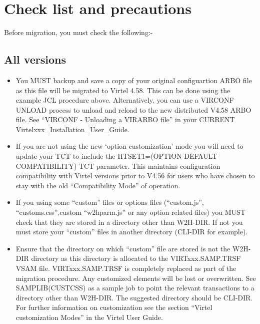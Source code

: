 \documentclass[letterpaper,10pt,english]{sphinxmanual}
\begin{document}
\chapter{Check list and precautions}
\label{\detokenize{Migration_Guide:check-list-and-precautions}}\label{\detokenize{Migration_Guide:index-2}}
Before migration, you must check the following:-


\section{All versions}
\label{\detokenize{Migration_Guide:all-versions}}\begin{itemize}
\item {} 
You MUST backup and save a copy of your original configuartion ARBO file as this file will be migrated to Virtel 4.58. This can be done using the example JCL procedure above. Alternatively, you can use a VIRCONF UNLOAD process to unload and reload to the new distributed V4.58 ARBO file. See “VIRCONF - Unloading a VIRARBO file” in your CURRENT Virtelxxx\_Installation\_User\_Guide.

\item {} 
If you are not using the new ‘option customization’ mode you will need to update your TCT to include the HTSET1=(OPTION-DEFAULT-COMPATIBILITY) TCT parameter. This maintains configuration compatibility with Virtel versions prior to V4.56 for users who have chosen to stay with the old “Compatibility Mode” of operation.

\item {} 
If you using some “custom” files or options files (“custom.js”, “customs.css”,custom “w2hparm.js” or any option related files) you MUST check that they are stored in a directory other than W2H-DIR. If not you must store your “custom” files in another directory (CLI-DIR for example).

\item {} 
Ensure that the directory on which “custom” file are stored is not the W2H-DIR directory as this directory is allocated to the VIRTxxx.SAMP.TRSF VSAM file. VIRTxxx.SAMP.TRSF is completely replaced as part of the migration procedure. Any customized elements will be lost or overwritten. See SAMPLIB(CUSTCSS) as a sample job to point the relevant transactions to a directory other than W2H-DIR. The suggested directory should be CLI-DIR. For further information on customization see the section “Virtel customization Modes” in the Virtel User Guide.

\end{itemize}
\end{document}
